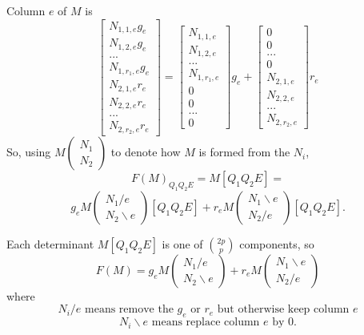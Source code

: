 \documentclass{beamer}
\begin{document}
\begin{frame}
  Column $e$ of $M$ is
\[
\left[\begin{array}{c}
    N_{1,1,e}g_e\\
    N_{1,2,e}g_e\\
    ...\\
    N_{1,r_1,e}g_e\\
    N_{2,1,e}r_e\\
    N_{2,2,e}r_e\\
    ...\\
    N_{2,r_2,e}r_e
  \end{array}\right]
=
\left[\begin{array}{c}
    N_{1,1,e}\\
    N_{1,2,e}\\
    ...\\
    N_{1,r_1,e}\\
    0\\
    0\\
    ...\\
    0
  \end{array}\right]g_e
+
\left[\begin{array}{c}
    0\\
    0\\
    ...\\
    0\\
    N_{2,1,e}\\
    N_{2,2,e}\\
    ...\\
    N_{2,r_2,e}
  \end{array}\right]r_e
\]
So, using $M\left(\begin{array}{c} N_1\\ N_2 \end{array} \right)$
to denote how $M$ is formed from the $N_i$,
\[
F(M)_{Q_1Q_2E} = M[Q_1Q_2E] =
\]
\[
g_eM\left(\begin{array}{c} N_1/e\\ N_2\backslash e \end{array} \right)[Q_1Q_2E]
+
r_eM\left(\begin{array}{c} N_1\backslash e\\ N_2/e \end{array} \right)[Q_1Q_2E].
\]
\end{frame}

\begin{frame}
  Each determinant $M[Q_1Q_2E]$ is one of $\binom{2p}{p}$ components, so
  \[
  F(M) =
  g_eM\left(\begin{array}{c} N_1/e\\ N_2\backslash e \end{array} \right)
+
r_eM\left(\begin{array}{c} N_1\backslash e\\ N_2/e \end{array} \right)
\]
where
\[
N_i/e \text{\ means remove the\ } g_e \text{\ or\ } r_e \text{\ but otherwise keep column\ }e
\]
\[
N_i\backslash e \text{\ means replace column\ }e\text{\ by\ }0.
\]
\end{frame}
\end{document}
